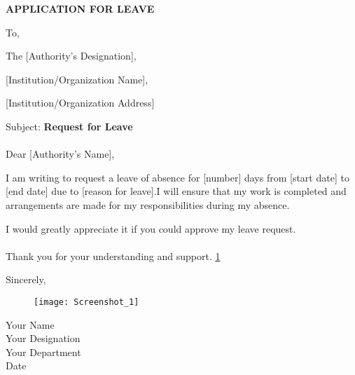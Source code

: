 \documentclass[12pt]{book}
\begin{document}
\vspace*{2cm}

\begin{center}
\Large\textbf{APPLICATION FOR LEAVE}
\end{center}

\vspace{1.5cm}
\date{ }
To,

The [Authority's Designation],

[Institution/Organization Name],

[Institution/Organization Address]

\vspace{1cm}

Subject: \textbf{Request for Leave}
\\\\
Dear [Authority's Name],

I am writing to request a leave of absence for [number] days from [start date] to [end date] due to [reason for leave].I will ensure that my work is completed and arrangements are made for my responsibilities during my absence.

I would greatly appreciate it if you could approve my leave request.
\\\\
Thank you for your understanding and support. \ref{fig:hi}

\vspace{1.5cm}

Sincerely,

\begin{figure}[h]
\texttt{[image: Screenshot\_1]}
\label{fig:hi}
\end{figure}

Your Name \\
Your Designation \\
Your Department \\
Date
\end{document}
